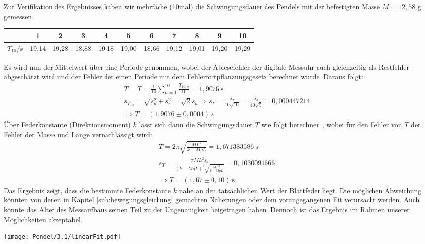 Zur Verifikation des Ergebnisses haben wir mehrfache (10mal) die Schwingungsdauer des Pendels mit der befestigten Masse $M = 12,58$ g gemessen.
\begin{center}
    \begin{tabular}{ c | cccccccccc }
        {} & 1 & 2 & 3 &4 &5 &6 &7 &8 &9 &10\\
        \hline
        $T_10$/s&19,14&19,28&18,88&19,18&19,00&18,66&19,12&19,01&19,20&19,29\\
    \end{tabular}
    \label{tab:schwingung}
\end{center}
Es wird nun der Mittelwert über eine Periode genommen, wobei der Ablesefehler der digitale Messuhr auch gleichzeitig als Restfehler abgeschätzt wird und der Fehler der einen Periode mit dem Fehlerfortpflanzungsgesetz berechnet wurde. Daraus folgt:
\begin{gather}
    T = \overline{T} = \frac{1}{10} \sum_{n = 1}^{10} \frac{T_{10,n}}{10} = 1,9076~\text{s}\\
    s_{T_{10}} = \sqrt{s_a^2+s_r^2}=\sqrt{2}s_a \Rightarrow s_T = \frac{s_T}{10\sqrt{10}} = \frac{s_a}{10\sqrt{5}} = 0,000447214\\[0,5cm]
    \Rightarrow\boxed{T = (1,9076 \pm 0,0004)~\text{s}}
\end{gather}
\newpage
Über Federkonstante (Direktionsmoment) $k$ lässt sich dann die Schwingungsdauer $T$ wie folgt berechnen \citep{Leifi}, wobei für den Fehler von $T$ der Fehler der Masse und Länge vernachlässigt wird:
\begin{gather}
    T = 2\pi\sqrt{\frac{ML^2}{k- MgL}} = 1,671383586~\text{s}\\
    s_T = \frac{\pi ML^2 s_k}{(k-MgL)^2 \sqrt{\frac{ML^2}{k- MgL}}} = 0,1030091566\\[0,5cm]
    \Rightarrow\boxed{T = (1,67 \pm 0,10)~\text{s}}
\end{gather}
Das Ergebnis zeigt, dass die bestimmte Federkonstante $k$ nahe an den tatsächlichen Wert der Blattfeder liegt. Die möglichen Abweichung könnten von denen in Kapitel \ref{sub:bewegungsgleichung} gemachten Näherungen oder dem vorangegangenen Fit verursacht werden. Auch könnte das Alter des Messaufbaus seinen Teil zu der Ungenauigkeit beigetragen haben. Dennoch ist das Ergebnis im Rahmen unserer Möglichkeiten akzeptabel.
\newpage
\begin{center}
    \texttt{[image: Pendel/3.1/linearFit.pdf]}
    \label{image:linFit}
\end{center}

